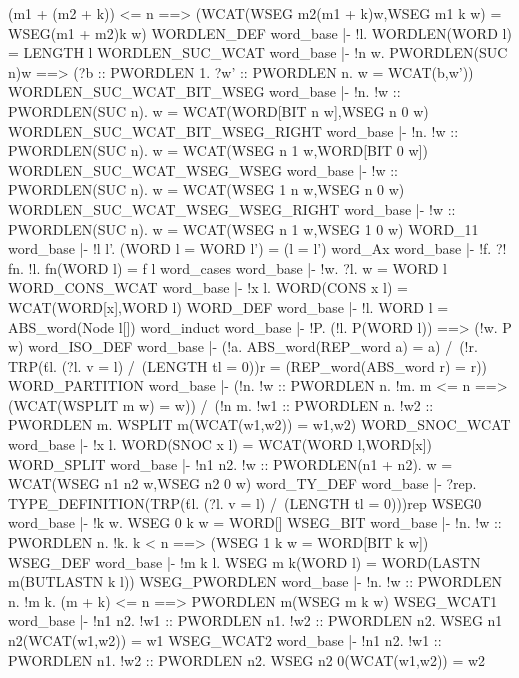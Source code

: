       (m1 + (m2 + k)) <= n ==>
      (WCAT(WSEG m2(m1 + k)w,WSEG m1 k w) = WSEG(m1 + m2)k w)
\ENDTHEOREM
\THEOREM WORDLEN\_DEF word\_base
|- !l. WORDLEN(WORD l) = LENGTH l
\ENDTHEOREM
\THEOREM WORDLEN\_SUC\_WCAT word\_base
|- !n w.
    PWORDLEN(SUC n)w ==>
    (?b :: PWORDLEN 1. ?w' :: PWORDLEN n. w = WCAT(b,w'))
\ENDTHEOREM
\THEOREM WORDLEN\_SUC\_WCAT\_BIT\_WSEG word\_base
|- !n. !w :: PWORDLEN(SUC n). w = WCAT(WORD[BIT n w],WSEG n 0 w)
\ENDTHEOREM
\THEOREM WORDLEN\_SUC\_WCAT\_BIT\_WSEG\_RIGHT word\_base
|- !n. !w :: PWORDLEN(SUC n). w = WCAT(WSEG n 1 w,WORD[BIT 0 w])
\ENDTHEOREM
\THEOREM WORDLEN\_SUC\_WCAT\_WSEG\_WSEG word\_base
|- !w :: PWORDLEN(SUC n). w = WCAT(WSEG 1 n w,WSEG n 0 w)
\ENDTHEOREM
\THEOREM WORDLEN\_SUC\_WCAT\_WSEG\_WSEG\_RIGHT word\_base
|- !w :: PWORDLEN(SUC n). w = WCAT(WSEG n 1 w,WSEG 1 0 w)
\ENDTHEOREM
\THEOREM WORD\_11 word\_base
|- !l l'. (WORD l = WORD l') = (l = l')
\ENDTHEOREM
\THEOREM word\_Ax word\_base
|- !f. ?! fn. !l. fn(WORD l) = f l
\ENDTHEOREM
\THEOREM word\_cases word\_base
|- !w. ?l. w = WORD l
\ENDTHEOREM
\THEOREM WORD\_CONS\_WCAT word\_base
|- !x l. WORD(CONS x l) = WCAT(WORD[x],WORD l)
\ENDTHEOREM
\THEOREM WORD\_DEF word\_base
|- !l. WORD l = ABS_word(Node l[])
\ENDTHEOREM
\THEOREM word\_induct word\_base
|- !P. (!l. P(WORD l)) ==> (!w. P w)
\ENDTHEOREM
\THEOREM word\_ISO\_DEF word\_base
|- (!a. ABS_word(REP_word a) = a) /\
   (!r.
     TRP(\v tl. (?l. v = l) /\ (LENGTH tl = 0))r =
     (REP_word(ABS_word r) = r))
\ENDTHEOREM
\THEOREM WORD\_PARTITION word\_base
|- (!n. !w :: PWORDLEN n. !m. m <= n ==> (WCAT(WSPLIT m w) = w)) /\
   (!n m.
     !w1 :: PWORDLEN n. !w2 :: PWORDLEN m. WSPLIT m(WCAT(w1,w2)) = w1,w2)
\ENDTHEOREM
\THEOREM WORD\_SNOC\_WCAT word\_base
|- !x l. WORD(SNOC x l) = WCAT(WORD l,WORD[x])
\ENDTHEOREM
\THEOREM WORD\_SPLIT word\_base
|- !n1 n2. !w :: PWORDLEN(n1 + n2). w = WCAT(WSEG n1 n2 w,WSEG n2 0 w)
\ENDTHEOREM
\THEOREM word\_TY\_DEF word\_base
|- ?rep. TYPE_DEFINITION(TRP(\v tl. (?l. v = l) /\ (LENGTH tl = 0)))rep
\ENDTHEOREM
\THEOREM WSEG0 word\_base
|- !k w. WSEG 0 k w = WORD[]
\ENDTHEOREM
\THEOREM WSEG\_BIT word\_base
|- !n. !w :: PWORDLEN n. !k. k < n ==> (WSEG 1 k w = WORD[BIT k w])
\ENDTHEOREM
\THEOREM WSEG\_DEF word\_base
|- !m k l. WSEG m k(WORD l) = WORD(LASTN m(BUTLASTN k l))
\ENDTHEOREM
\THEOREM WSEG\_PWORDLEN word\_base
|- !n. !w :: PWORDLEN n. !m k. (m + k) <= n ==> PWORDLEN m(WSEG m k w)
\ENDTHEOREM
\THEOREM WSEG\_WCAT1 word\_base
|- !n1 n2.
    !w1 :: PWORDLEN n1. !w2 :: PWORDLEN n2. WSEG n1 n2(WCAT(w1,w2)) = w1
\ENDTHEOREM
\THEOREM WSEG\_WCAT2 word\_base
|- !n1 n2.
    !w1 :: PWORDLEN n1. !w2 :: PWORDLEN n2. WSEG n2 0(WCAT(w1,w2)) = w2
